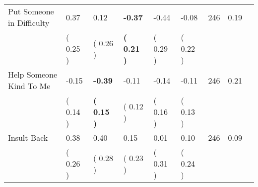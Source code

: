\begin{tabular}{L{6.2cm} C{1.8cm} C{1.8cm} C{1.8cm} C{1.8cm} C{1.8cm} C{1.8cm} C{0.3cm} C{0.3cm}}
Put Someone in Difficulty &      0.37 &      0.12 & \textbf{    -0.37} &     -0.44 &     -0.08  & 246 &       0.19 \\ 
 & (     0.25 ) & (     0.26 ) & \textbf{(     0.21 )} & (     0.29 ) & (     0.22 )  & \\
Help Someone Kind To Me &     -0.15 & \textbf{    -0.39} &     -0.11 &     -0.14 &     -0.11  & 246 &       0.21 \\ 
 & (     0.14 ) & \textbf{(     0.15 )} & (     0.12 ) & (     0.16 ) & (     0.13 )  & \\
Insult Back &      0.38 &      0.40 &      0.15 &      0.01 &      0.10  & 246 &       0.09 \\ 
 & (     0.26 ) & (     0.28 ) & (     0.23 ) & (     0.31 ) & (     0.24 )  & \\
\bottomrule
\end{tabular}
